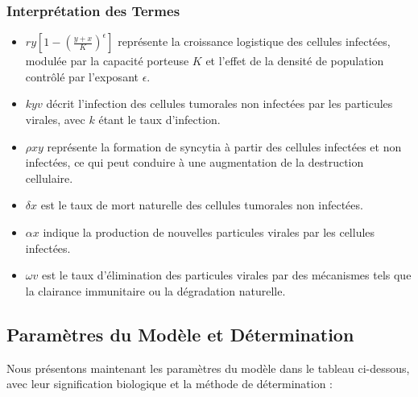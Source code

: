 \documentclass{article}
\begin{document}
\subsubsection{Interprétation des Termes}
\begin{itemize}
  \item \( ry\left[1 - \left(\frac{y + x}{K}\right)^\epsilon\right] \) représente la croissance logistique des cellules infectées, modulée par la capacité porteuse \( K \) et l'effet de la densité de population contrôlé par l'exposant \( \epsilon \).
  \item \( kyv \) décrit l'infection des cellules tumorales non infectées par les particules virales, avec \( k \) étant le taux d'infection.
  \item \( \rho xy \) représente la formation de syncytia à partir des cellules infectées et non infectées, ce qui peut conduire à une augmentation de la destruction cellulaire.
  \item \( \delta x \) est le taux de mort naturelle des cellules tumorales non infectées.
  \item \( \alpha x \) indique la production de nouvelles particules virales par les cellules infectées.
  \item \( \omega v \) est le taux d'élimination des particules virales par des mécanismes tels que la clairance immunitaire ou la dégradation naturelle.
\end{itemize}

\subsection{Paramètres du Modèle et Détermination}
Nous présentons maintenant les paramètres du modèle dans le tableau ci-dessous, avec leur signification biologique et la méthode de détermination :
\end{document}
